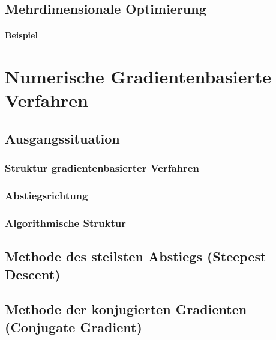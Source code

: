         \subsection{Mehrdimensionale Optimierung} %

            \paragraph{Beispiel} %

    \section{Numerische Gradientenbasierte Verfahren} %

        \subsection{Ausgangssituation} %

            \subsubsection{Struktur gradientenbasierter Verfahren} %

            \subsubsection{Abstiegsrichtung} %

            \subsubsection{Algorithmische Struktur} %

        \subsection{Methode des steilsten Abstiegs (Steepest Descent)} %

        \subsection{Methode der konjugierten Gradienten (Conjugate Gradient)} %

